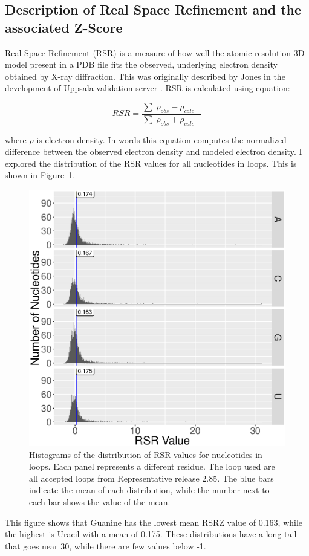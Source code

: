 \subsection{Description of Real Space Refinement and the associated Z-Score}

Real Space Refinement (RSR) is a measure of how well the atomic resolution 3D
model present in a PDB file fits the observed, underlying electron density
obtained by X-ray diffraction. This was originally described by Jones \etal{} in
the development of Uppsala validation server \cite{Kleywegt2004a}. RSR is
calculated using equation:

\begin{equation}
  RSR = \frac{\sum \mid \rho_{obs} - \rho_{calc} \mid}
             {\sum \mid \rho_{obs} + \rho_{calc} \mid}
\end{equation}

where $\rho$ is electron density. In words this equation computes the normalized
difference between the observed electron density and modeled electron density. I
explored the distribution of the RSR values for all nucleotides in loops. This
is shown in Figure~\ref{fig:rsr-nt-distribution}.

\begin{figure}[ht]
  \includegraphics[width=0.5\linewidth]{chapter-5/figs/rsr-distrubutution}
  \caption{Histograms of the distribution of RSR values for nucleotides in
    loops. Each panel represents a different residue. The loop used are all
    accepted loops from Representative release 2.85. The blue bars indicate the mean
  of each distribution, while the number next to each bar shows the value of the
  mean.}
  \label{fig:rsr-nt-distribution}
\end{figure}

This figure shows that Guanine has the lowest mean RSRZ value of 0.163, while
the highest is Uracil with a mean of 0.175. These distributions have a long tail
that goes near 30, while there are few values below -1. 

